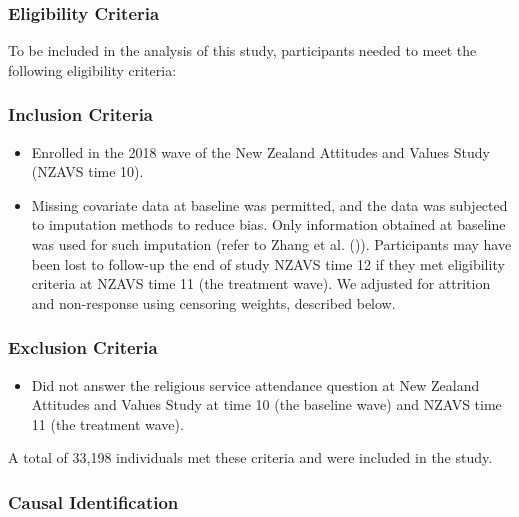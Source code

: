\documentclass[
  single column]{article}
\providecommand{\tightlist}{%
  \setlength{\itemsep}{0pt}\setlength{\parskip}{0pt}}\usepackage{longtable,booktabs,array}
\begin{document}
\subsubsection{Eligibility Criteria}\label{eligibility-criteria}

To be included in the analysis of this study, participants needed to
meet the following eligibility criteria:

\subsubsection{Inclusion Criteria}\label{inclusion-criteria}

\begin{itemize}
\tightlist
\item
  Enrolled in the 2018 wave of the New Zealand Attitudes and Values
  Study (NZAVS time 10).
\item
  Missing covariate data at baseline was permitted, and the data was
  subjected to imputation methods to reduce bias. Only information
  obtained at baseline was used for such imputation (refer to Zhang et
  al. ()).
  Participants may have been lost to follow-up the end of study NZAVS
  time 12 if they met eligibility criteria at NZAVS time 11 (the
  treatment wave). We adjusted for attrition and non-response using
  censoring weights, described below.
\end{itemize}

\subsubsection{Exclusion Criteria}\label{exclusion-criteria}

\begin{itemize}
\tightlist
\item
  Did not answer the religious service attendance question at New
  Zealand Attitudes and Values Study at time 10 (the baseline wave) and
  NZAVS time 11 (the treatment wave).
\end{itemize}

A total of 33,198 individuals met these criteria and were included in
the study.

\subsubsection{Causal Identification}\label{causal-identification}
\end{document}
